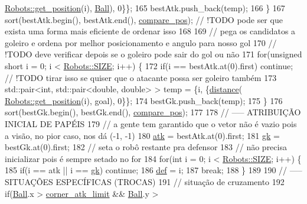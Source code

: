 \begin{DoxyCode}
      \hyperlink{class_robots_a1fca8f2f5070176faa6ba1efa2f1ff14}{Robots::get\_position}(i), \hyperlink{class_strategy_abd16b6276e747f6cd99a19963ff5495b}{Ball}), 0\}\};
165         bestAtk.push\_back(temp);
166     \}
167     sort(bestAtk.begin(), bestAtk.end(), \hyperlink{strategy_8cpp_a10738a2f35566666f846dfde7ecc5a46}{compare\_pos}); \textcolor{comment}{// !TODO pode ser que exista uma forma
       mais eficiente de ordenar isso}
168 
169     \textcolor{comment}{// pega os candidatos a goleiro e ordena por melhor posicionamento e angulo para nosso gol}
170     \textcolor{comment}{// !TODO deve verificar depois se o goleiro pode sair do gol ou não}
171     \textcolor{keywordflow}{for}(\textcolor{keywordtype}{unsigned} \textcolor{keywordtype}{short} i = 0; i < \hyperlink{class_robots_ae9df2f1d345ad6740f0459956cdd4712}{Robots::SIZE}; i++) \{
172         \textcolor{keywordflow}{if}(i == bestAtk.at(0).first) \textcolor{keywordflow}{continue}; \textcolor{comment}{// !TODO tirar isso se quiser que o atacante possa ser
       goleiro também}
173         std::pair<int, std::pair<double, double> > temp = \{i, \{\hyperlink{class_strategy_aacce05caed71553c4efd2d28c9c3aa39}{distance}(
      \hyperlink{class_robots_a1fca8f2f5070176faa6ba1efa2f1ff14}{Robots::get\_position}(i), goal), 0\}\};
174         bestGk.push\_back(temp);
175     \}
176     sort(bestGk.begin(), bestGk.end(), \hyperlink{strategy_8cpp_a10738a2f35566666f846dfde7ecc5a46}{compare\_pos});
177 
178     \textcolor{comment}{// ----- ATRIBUIÇÃO INICIAL DE PAPÉIS}
179     \textcolor{comment}{// a gente tem garantido que o vetor não é vazio pois a visão, no pior caso, nos dá (-1, -1)}
180     \hyperlink{class_strategy_af06cfb5e28b7a30cfaa312c7a1c051b1}{atk} = bestAtk.at(0).first;
181     \hyperlink{class_strategy_a7efb4f780b78ee593649340a7f948c36}{gk} = bestGk.at(0).first;
182     \textcolor{comment}{// seta o robô restante pra defensor}
183     \textcolor{comment}{// não precisa inicializar pois é sempre setado no for}
184     \textcolor{keywordflow}{for}(\textcolor{keywordtype}{int} i = 0; i < \hyperlink{class_robots_ae9df2f1d345ad6740f0459956cdd4712}{Robots::SIZE}; i++) \{
185         \textcolor{keywordflow}{if}(i == atk || i == \hyperlink{class_strategy_a7efb4f780b78ee593649340a7f948c36}{gk}) \textcolor{keywordflow}{continue};
186         \hyperlink{class_strategy_ade11a007d9479832ddc5e69169e23692}{def} = i;
187         \textcolor{keywordflow}{break};
188     \}
189 
190     \textcolor{comment}{// ----- SITUAÇÕES ESPECÍFICAS (TROCAS)}
191     \textcolor{comment}{// situação de cruzamento}
192     \textcolor{keywordflow}{if}(\hyperlink{class_strategy_abd16b6276e747f6cd99a19963ff5495b}{Ball}.x > \hyperlink{namespace_c_o_n_s_t_a2dae2bbcbbd0735ad1544509929d1c8f}{corner\_atk\_limit} && \hyperlink{class_strategy_abd16b6276e747f6cd99a19963ff5495b}{Ball}.y > 

\end{DoxyCode}
